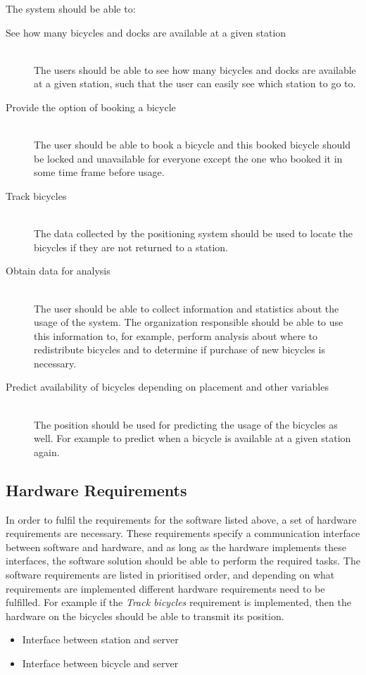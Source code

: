The system should be able to:
\begin{description}
\item[See how many bicycles and docks are available at a given station] \hfill \\
The users should be able to see how many bicycles and docks are available at a given station, such that the user can easily see which station to go to.
\item[Provide the option of booking a bicycle] \hfill \\
The user should be able to book a bicycle and this booked bicycle should be locked and unavailable for everyone except the one who booked it in some time frame before usage.
\item[Track bicycles] \hfill \\
The data collected by the positioning system should be used to locate the bicycles if they are not returned to a station.
\item[Obtain data for analysis] \hfill \\
The user should be able to collect information and statistics about the usage of the system.
The organization responsible should be able to use this information to, for example, perform analysis about where to redistribute bicycles and to determine if purchase of new bicycles is necessary.
\item[Predict availability of bicycles depending on placement and other variables] \hfill \\
The position should be used for predicting the usage of the bicycles as well. 
For example to predict when a bicycle is available at a given station again.
\end{description}

\subsection{Hardware Requirements}
In order to fulfil the requirements for the software listed above, a set of hardware requirements are necessary.
These requirements specify a communication interface between software and hardware, and as long as the hardware implements these interfaces, the software solution should be able to perform the required tasks.
The software requirements are listed in prioritised order, and depending on what requirements are implemented different hardware requirements need to be fulfilled. 
For example if the \textit{Track bicycles} requirement is implemented, then the hardware on the bicycles should be able to transmit its position.
\begin{itemize}
	\item Interface between station and server
	\item Interface between bicycle and server
\end{itemize}
